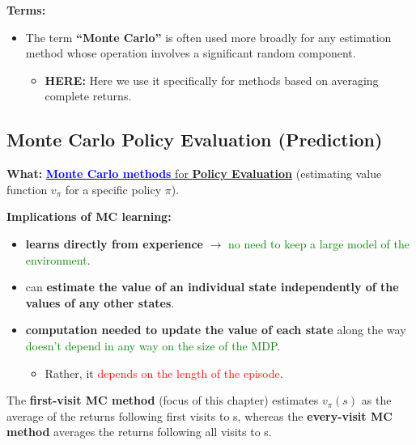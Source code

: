 \documentclass[12pt, a4paper]{article}
\begin{document}
\textbf{Terms:}

\begin{itemize}
\item
  The term \textbf{``Monte Carlo''} is often used more broadly for any
  estimation method whose operation involves a significant random
  component.

  \begin{itemize}
  \item
    \textbf{HERE:} Here we use it specifically for methods based on
    averaging complete returns.
  \end{itemize}
\end{itemize}






\subsection{Monte Carlo Policy Evaluation (Prediction)}\label{monte-carlo-prediction}

\textbf{What:} \uline{\textbf{\textcolor{blue}{Monte Carlo methods}} for \textbf{Policy Evaluation}} (estimating value function $v_\pi$ for a specific policy $\pi$).


\textbf{Implications of MC learning:}

\begin{itemize}
  \item \textbf{learns directly from experience} $\rightarrow$ \textcolor{Green}{no need to keep a large model of the environment}.
  \item can \textbf{estimate the value of an individual state independently of the values of any other states}.
  \item \textbf{computation needed to update the value of each state} along the way \textcolor{Green}{doesn't depend in any way on the size of the MDP}.
  \begin{itemize}
    \item Rather, it \textcolor{Red}{depends on the length of the episode}.
  \end{itemize}
\end{itemize}



The \textbf{first-visit MC method} (focus of this chapter) estimates
\(v_\pi(s)\) as the average of the returns following first visits to s,
whereas the \textbf{every-visit MC method} averages the returns
following all visits to s.
\end{document}
